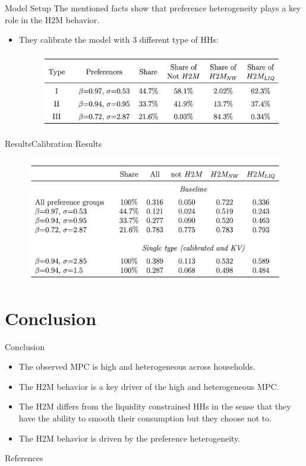 \documentclass{beamer}
\begin{document}
\begin{frame}{Model Setup}
	The mentioned facts show that preference heterogeneity plays a key role in the H2M behavior.
	\begin{itemize}
		\item <1-> They calibrate the model with 3 different type of HHs:
		\begin{figure}
			\centering
			\includegraphics[width=0.7\linewidth]{Figures/Table10.png}
		\end{figure}
	\end{itemize}
\end{frame}
\begin{frame}{Results}{Calibration Results}
	\label{table13}
	\begin{figure}
		\centering
		\includegraphics[width=0.85\linewidth]{Figures/Table13.png}
	\end{figure}
\end{frame}

\section{Conclusion}
\begin{frame}{Conclusion}
	\begin{itemize}
		\item <1-> The observed MPC is high and heterogeneous across households.
		\item <2-> The H2M behavior is a key driver of the high and heterogeneous MPC.
		\item <3-> The H2M differs from the liquidity constrained HHs in the sense that they have the ability to smooth their consumption but they choose not to.
		\item <4-> The H2M behavior is driven by the preference heterogeneity.
	\end{itemize}
\end{frame}



\scriptsize 
	\begin{frame}[allowframebreaks]{References}
			

		
	\end{frame}
	
	\normalsize
\end{document}

